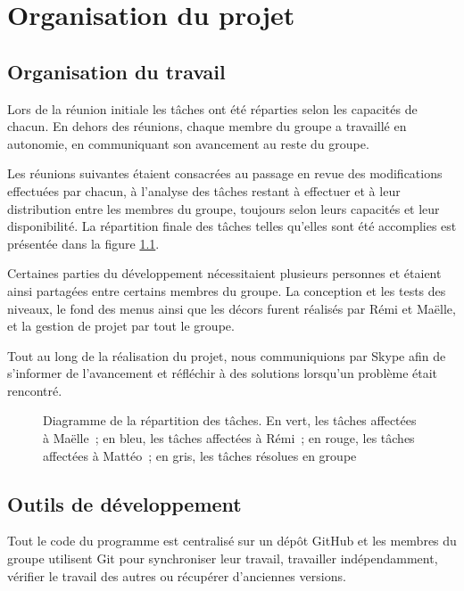 \chapter{Organisation du projet}

\section{Organisation du travail}

Lors de la réunion initiale les tâches ont été réparties selon les capacités
de chacun. En dehors des réunions, chaque membre du groupe a travaillé en
autonomie, en communiquant son avancement au reste du groupe.

Les réunions suivantes étaient consacrées au passage en revue des modifications
effectuées par chacun, à l'analyse des tâches restant à effectuer et à leur
distribution entre les membres du groupe, toujours selon leurs capacités
et leur disponibilité.
La répartition finale des tâches telles qu'elles sont été accomplies
est présentée dans la figure \ref{fig:organisation-gantt}.

Certaines parties du développement nécessitaient plusieurs personnes et
étaient ainsi partagées entre certains membres du groupe. La conception
et les tests des niveaux, le fond des menus ainsi que les décors furent
réalisés par Rémi et Maëlle, et la gestion de projet par tout le groupe.

Tout au long de la réalisation du projet, nous communiquions par Skype
afin de s'informer de l'avancement et réfléchir à des solutions lorsqu'un
problème était rencontré.

\thispagestyle{empty}
\begin{figure}[p!]
    \centering
    
    \caption{
        Diagramme de la répartition des tâches. En vert, les tâches
        affectées à Maëlle~; en bleu, les tâches affectées à Rémi~;
        en rouge, les tâches affectées à Mattéo~; en gris, les
        tâches résolues en groupe
    }
    \label{fig:organisation-gantt}
\end{figure}
\restoregeometry

\section{Outils de développement}

Tout le code du programme est centralisé sur un dépôt GitHub et les membres
du groupe utilisent Git pour synchroniser leur travail, travailler
indépendamment, vérifier le travail des autres ou récupérer
d'anciennes versions.
\cite{organisation-github-skizzle}

